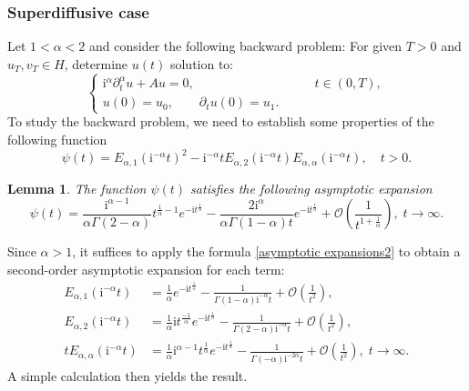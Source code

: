 \documentclass[reqno]{amsart}
\makeatletter
\renewenvironment{proof}[1][\proofname]{\par
  \pushQED{\qed}%
  \normalfont \topsep6\p@\@plus6\p@\relax
  \trivlist
  \item[\hskip\labelsep\bfseries #1\@addpunct{.}]%
}{%
  \popQED\endtrivlist\@endpefalse
}
\newtheorem{lem}[theorem]{Lemma}
\numberwithin{equation}{section}
\makeatother
\begin{document}
\subsubsection{Superdiffusive case}
Let $1<\alpha<2$ and consider the following backward problem: For given $T>0$ and $u_T,v_T\in H$, determine $u(t)$ solution to:
\begin{equation}\label{fsweq}
\begin{cases}
\mathrm{i}^{\alpha}\partial_t^\alpha u +Au=0, &\qquad t \in (0,T),\\
u(0)=u_0, \qquad \partial_t u(0)=u_1.
\end{cases}
\end{equation}
To study the backward problem, we need to establish some properties of the following function
\begin{equation}\label{psidf}
\psi(t)=E_{\alpha, 1}(\mathrm{i}^{-\alpha}t)^2-\mathrm{i}^{-\alpha}t E_{\alpha, 2}(\mathrm{i}^{-\alpha}t) E_{\alpha, \alpha}(\mathrm{i}^{-\alpha}t), \quad t>0.
\end{equation}

\begin{lem}
The function $\psi(t)$ satisfies the following asymptotic expansion
\begin{equation}\label{asypsi}
\psi(t)=\frac{\mathrm{i}^{\alpha-1}}{\alpha\Gamma(2-\alpha)} t^{\frac{1}{\alpha}-1}e^{-\mathrm{i}t^{\frac{1}{\alpha}}}-\frac{2 \mathrm{i}^\alpha}{\alpha\Gamma(1-\alpha)t}e^{-\mathrm{i}t^{\frac{1}{\alpha}}}+\mathcal{O}\left(\frac{1}{t^{1+\frac{1}{\alpha}}}\right), \; t\to \infty.
\end{equation}
\end{lem}

\begin{proof}
Since $\alpha>1$, it suffices to apply the formula \eqref{asymptotic expansions2} to obtain a second-order asymptotic expansion for each term:
\begin{equation}\label{asyE}
\begin{aligned}
E_{\alpha, 1}(\mathrm{i}^{-\alpha}t)&=\frac{1}{\alpha} e^{-\mathrm{i}t^{\frac{1}{\alpha}}}-\frac{1}{\Gamma(1-\alpha) \mathrm{i}^{-\alpha}t}+\mathcal{O}\left(\frac{1}{t^2}\right), \\
E_{\alpha, 2}(\mathrm{i}^{-\alpha}t)&=\frac{1}{\alpha} \mathrm{i}t^{\frac{-1}{\alpha}} e^{-\mathrm{i}t^{\frac{1}{\alpha}}}-\frac{1}{\Gamma(2-\alpha) \mathrm{i}^{-\alpha}t}+\mathcal{O}\left(\frac{1}{t^2}\right), \\
tE_{\alpha, \alpha}(\mathrm{i}^{-\alpha}t)&=\frac{1}{\alpha} \mathrm{i}^{\alpha-1}t^{\frac{1}{\alpha}} e^{-\mathrm{i}t^{\frac{1}{\alpha}}}-\frac{1}{\Gamma(-\alpha) \mathrm{i}^{-2\alpha}t} +\mathcal{O}\left(\frac{1}{t^2}\right), \; t\to \infty.
\end{aligned}
\end{equation}
A simple calculation then yields the result.
\end{proof}
\end{document}
